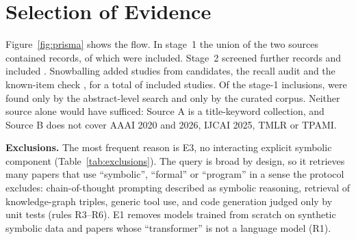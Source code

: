 \section{Selection of Evidence}
\label{sec:selection}



Figure~\ref{fig:prisma} shows the flow. In stage~1 the union of the two sources contained  records, of which  were included. Stage~2 screened  further records and included . Snowballing added  studies from  candidates, the recall audit  and the known-item check , for a total of  included studies. Of the stage-1 inclusions,  were found only by the abstract-level search and  only by the curated corpus. Neither source alone would have sufficed: Source A is a title-keyword collection, and Source B does not cover AAAI 2020 and 2026, IJCAI 2025, TMLR or TPAMI.

\begin{table}[t]
\centering
\caption{Reasons for exclusion (stage-1 union, stage 2, snowball and known-item records). Each excluded record has the single most fundamental code.}
\label{tab:exclusions}
\footnotesize

\end{table}

\textbf{Exclusions.} The most frequent reason is E3, no interacting explicit symbolic component (Table~\ref{tab:exclusions}). The query is broad by design, so it retrieves many papers that use ``symbolic'', ``formal'' or ``program'' in a sense the protocol excludes: chain-of-thought prompting described as symbolic reasoning, retrieval of knowledge-graph triples, generic tool use, and code generation judged only by unit tests (rules R3--R6). E1 removes models trained from scratch on synthetic symbolic data and papers whose ``transformer'' is not a language model (R1).

\begin{table}[t]
\centering
\caption{Agreement between independent LLM reviewers before adjudication. Screening agreement is over three categories (include, exclude, unsure); the last column excludes records both screeners marked unsure.}
\label{tab:agreement}
\footnotesize
\setlength{\tabcolsep}{3pt}

\end{table}

